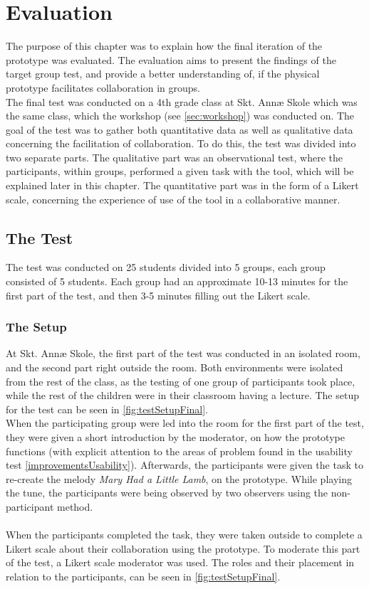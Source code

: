 \chapter{Evaluation}\label{evaluation}
The purpose of this chapter was to explain how the final iteration of the prototype was evaluated. The evaluation aims to present the findings of the target group test, and provide a better understanding of, if the physical prototype facilitates collaboration in groups.\\

The final test was conducted on a 4th grade class at Skt. Annæ Skole  which was the same class, which the workshop (see \autoref{sec:workshop}) was conducted on. The goal of the test was to gather both quantitative data as well as qualitative data concerning the facilitation of collaboration. To do this, the test was divided into two separate parts. The qualitative part was an observational test, where the participants, within groups, performed a given task with the tool, which will be explained later in this chapter. The quantitative part was in the form of a Likert scale, concerning the experience of use of the tool in a collaborative manner. 

\section{The Test}
The test was conducted on 25 students divided into 5 groups, each group consisted of 5 students. Each group had an approximate 10-13 minutes for the first part of the test, and then 3-5 minutes filling out the Likert scale.

\subsection{The Setup} \label{setuptest}
At Skt. Annæ Skole, the first part of the test was conducted in an isolated room, and the second part right outside the room. Both environments were isolated from the rest of the class, as the testing of one group of participants took place, while the rest of the children were in their classroom having a lecture. The setup for the test can be seen in \autoref{fig:testSetupFinal}.\\

When the participating group were led into the room for the first part of the test, they were given a short introduction by the moderator, on how the prototype functions (with explicit attention to the areas of problem found in the usability test \autoref{improvementsUsability}). Afterwards, the participants were given the task to re-create the melody \textit{Mary Had a Little Lamb}, on the prototype. While playing the tune, the participants were being observed by two observers using the non-participant method\cite[p.~64-67]{bjoernerBog}.\\\\
When the participants completed the task, they were taken outside to complete a Likert scale about their collaboration using the prototype. To moderate this part of the test, a Likert scale moderator was used. The roles and their placement in relation to the participants, can be seen in \autoref{fig:testSetupFinal}.

